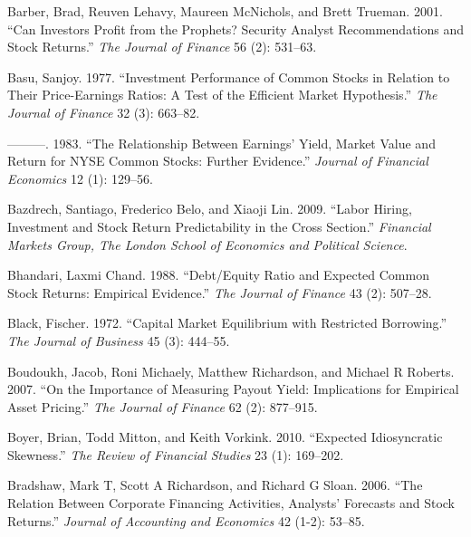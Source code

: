 \documentclass[
  letterpaper,
  DIV=11,
  numbers=noendperiod]{scrreprt}
\newlength{\cslhangindent}
\newlength{\cslentryspacingunit} %
\newenvironment{CSLReferences}[2] %
 {%
  \setlength{\parindent}{0pt}
  \ifodd #1
  \let\oldpar\par
  \def\par{\hangindent=\cslhangindent\oldpar}
  \fi
  \setlength{\parskip}{#2\cslentryspacingunit}
 }%
 {}
\begin{document}
\begin{CSLReferences}{1}{0}
\leavevmode{}%
Barber, Brad, Reuven Lehavy, Maureen McNichols, and Brett Trueman. 2001.
{``Can Investors Profit from the Prophets? Security Analyst
Recommendations and Stock Returns.''} \emph{The Journal of Finance} 56
(2): 531--63.

\leavevmode{}%
Basu, Sanjoy. 1977. {``Investment Performance of Common Stocks in
Relation to Their Price-Earnings Ratios: A Test of the Efficient Market
Hypothesis.''} \emph{The Journal of Finance} 32 (3): 663--82.

\leavevmode{}%
---------. 1983. {``The Relationship Between Earnings' Yield, Market
Value and Return for NYSE Common Stocks: Further Evidence.''}
\emph{Journal of Financial Economics} 12 (1): 129--56.

\leavevmode{}%
Bazdrech, Santiago, Frederico Belo, and Xiaoji Lin. 2009. {``Labor
Hiring, Investment and Stock Return Predictability in the Cross
Section.''} \emph{Financial Markets Group, The London School of
Economics and Political Science}.

\leavevmode{}%
Bhandari, Laxmi Chand. 1988. {``Debt/Equity Ratio and Expected Common
Stock Returns: Empirical Evidence.''} \emph{The Journal of Finance} 43
(2): 507--28.

\leavevmode{}%
Black, Fischer. 1972. {``Capital Market Equilibrium with Restricted
Borrowing.''} \emph{The Journal of Business} 45 (3): 444--55.

\leavevmode{}%
Boudoukh, Jacob, Roni Michaely, Matthew Richardson, and Michael R
Roberts. 2007. {``On the Importance of Measuring Payout Yield:
Implications for Empirical Asset Pricing.''} \emph{The Journal of
Finance} 62 (2): 877--915.

\leavevmode{}%
Boyer, Brian, Todd Mitton, and Keith Vorkink. 2010. {``Expected
Idiosyncratic Skewness.''} \emph{The Review of Financial Studies} 23
(1): 169--202.

\leavevmode{}%
Bradshaw, Mark T, Scott A Richardson, and Richard G Sloan. 2006. {``The
Relation Between Corporate Financing Activities, Analysts' Forecasts and
Stock Returns.''} \emph{Journal of Accounting and Economics} 42 (1-2):
53--85.


\end{CSLReferences}
\end{document}
